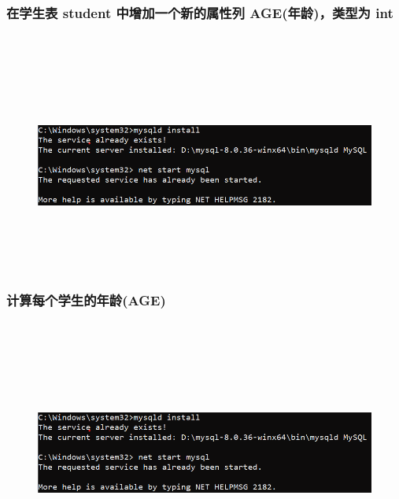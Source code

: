 \documentclass{ctexart}
\begin{document}
\subsubsection{在学生表 student 中增加一个新的属性列 AGE(年龄)，类型为 int}
\begin{lstlisting}[language=sql]
	
\end{lstlisting}
\begin{figure}[H]
	\centering 
	\includegraphics[height=7cm,width=14cm]{1.png}
	\end{figure}
\subsubsection{计算每个学生的年龄(AGE)}
\begin{lstlisting}[language=sql]
	
\end{lstlisting}
\begin{figure}[H]
	\centering 
	\includegraphics[height=7cm,width=14cm]{1.png}
	\end{figure}
\end{document}
